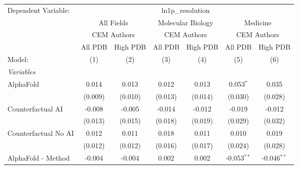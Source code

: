 \begingroup
\centering
\begin{tabular}{lcccccc}
   \tabularnewline \midrule \midrule
   Dependent Variable: & \multicolumn{6}{c}{ln1p\_resolution}\\
 & \multicolumn{2}{c}{All Fields} & \multicolumn{2}{c}{Molecular Biology} & \multicolumn{2}{c}{Medicine} \\
\cmidrule(lr){2-3} \cmidrule(lr){4-5} \cmidrule(lr){6-7}
 & \multicolumn{2}{c}{CEM Authors} & \multicolumn{2}{c}{CEM Authors} & \multicolumn{2}{c}{CEM Authors} \\
\cmidrule(lr){2-3} \cmidrule(lr){4-5} \cmidrule(lr){6-7}
 & \multicolumn{1}{c}{All PDB} & \multicolumn{1}{c}{High PDB} & \multicolumn{1}{c}{All PDB} & \multicolumn{1}{c}{High PDB} & \multicolumn{1}{c}{All PDB} & \multicolumn{1}{c}{High PDB} \\
\cmidrule(lr){2-2} \cmidrule(lr){3-3} \cmidrule(lr){4-4} \cmidrule(lr){5-5} \cmidrule(lr){6-6} \cmidrule(lr){7-7}
   Model:                                                     & (1)           & (2)            & (3)           & (4)           & (5)           & (6)\\  
   \midrule
   \emph{Variables}\\
   AlphaFold                                                  & 0.014         & 0.013          & 0.012         & 0.013         & 0.053$^{*}$   & 0.035\\   
                                                              & (0.009)       & (0.010)        & (0.013)       & (0.014)       & (0.030)       & (0.028)\\   
   Counterfactual AI                                          & -0.008        & -0.005         & -0.014        & -0.012        & -0.019        & -0.012\\   
                                                              & (0.013)       & (0.015)        & (0.018)       & (0.019)       & (0.029)       & (0.032)\\   
   Counterfactual No AI                                       & 0.012         & 0.011          & 0.018         & 0.011         & 0.010         & 0.019\\   
                                                              & (0.012)       & (0.012)        & (0.016)       & (0.017)       & (0.024)       & (0.028)\\   
   AlphaFold - Method                                         & -0.004        & -0.004         & 0.002         & 0.002         & -0.053$^{**}$ & -0.046$^{**}$\\   

\end{tabular}
